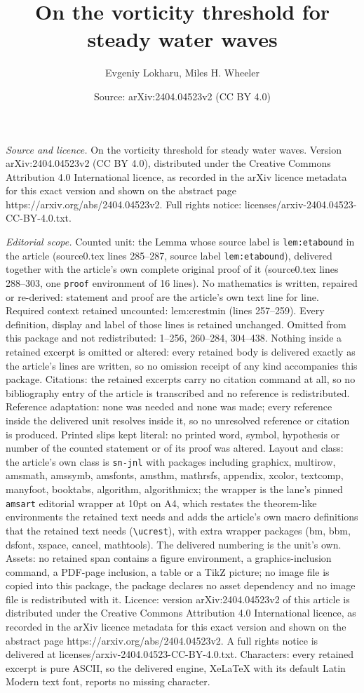 \documentclass[10pt,a4paper]{amsart}
\title[On the vorticity threshold for steady water waves]{On the vorticity threshold for steady water waves}
\author{Evgeniy Lokharu, Miles H. Wheeler}
\date{Source: arXiv:2404.04523v2 (CC BY 4.0)}
\begin{document}
\maketitle

\noindent\emph{Source and licence.} On the vorticity threshold for steady water waves. Version arXiv:2404.04523v2 (CC BY 4.0), distributed under the Creative Commons Attribution 4.0 International licence, as recorded in the arXiv licence metadata for this exact version and shown on the abstract page https://arxiv.org/abs/2404.04523v2. Full rights notice: licenses/arxiv-2404.04523-CC-BY-4.0.txt.\par\smallskip

\noindent\textit{Editorial scope.} Counted unit: the Lemma whose source label is \texttt{lem:etabound} in the article (source0.tex lines 285--287, source label \texttt{lem:etabound}), delivered together with the article's own complete original proof of it (source0.tex lines 288--303, one \texttt{proof} environment of 16 lines). No mathematics is written, repaired or re-derived: statement and proof are the article's own text line for line. Required context retained uncounted: lem:crestmin (lines 257--259). Every definition, display and label of those lines is retained unchanged. Omitted from this package and not redistributed: 1--256, 260--284, 304--438. Nothing inside a retained excerpt is omitted or altered: every retained body is delivered exactly as the article's lines are written, so no omission receipt of any kind accompanies this package. Citations: the retained excerpts carry no citation command at all, so no bibliography entry of the article is transcribed and no reference is redistributed. Reference adaptation: none was needed and none was made; every reference inside the delivered unit resolves inside it, so no unresolved reference or citation is produced. Printed slips kept literal: no printed word, symbol, hypothesis or number of the counted statement or of its proof was altered. Layout and class: the article's own class is \texttt{sn-jnl} with packages including graphicx, multirow, amsmath, amssymb, amsfonts, amsthm, mathrsfs, appendix, xcolor, textcomp, manyfoot, booktabs, algorithm, algorithmicx; the wrapper is the lane's pinned \texttt{amsart} editorial wrapper at 10pt on A4, which restates the theorem-like environments the retained text needs and adds the article's own macro definitions that the retained text needs (\texttt{\textbackslash ucrest}), with extra wrapper packages (bm, bbm, dsfont, xspace, cancel, mathtools). The delivered numbering is the unit's own. Assets: no retained span contains a figure environment, a graphics-inclusion command, a PDF-page inclusion, a table or a TikZ picture; no image file is copied into this package, the package declares no asset dependency and no image file is redistributed with it. Licence: version arXiv:2404.04523v2 of this article is distributed under the Creative Commons Attribution 4.0 International licence, as recorded in the arXiv licence metadata for this exact version and shown on the abstract page https://arxiv.org/abs/2404.04523v2. A full rights notice is delivered at licenses/arxiv-2404.04523-CC-BY-4.0.txt. Characters: every retained excerpt is pure ASCII, so the delivered engine, XeLaTeX with its default Latin Modern text font, reports no missing character.
\end{document}
